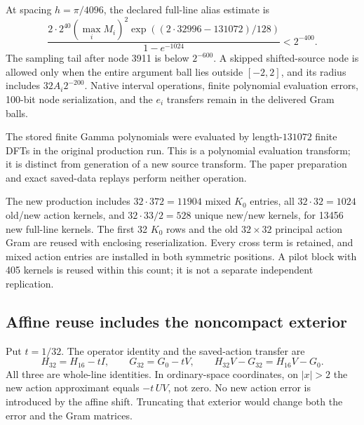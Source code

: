\documentclass[11pt,a4paper]{article}
\numberwithin{equation}{section}
\theoremstyle{definition}\newtheorem{definition}[theorem]{Definition}
\theoremstyle{remark}\newtheorem{remark}[theorem]{Remark}
\begin{document}
At spacing $h=\pi/4096$, the declared full-line alias estimate is
\begin{equation}\label{eq:alias64}
 \frac{2\cdot2^{40}(\max_iM_i)^2
 \exp((2\cdot32996-131072)/128)}{1-e^{-1024}}
 <2^{-400}.
\end{equation}
The sampling tail after node 3911 is below $2^{-600}$. A skipped shifted-source node is allowed only when the entire argument ball lies outside $[-2,2]$, and its radius includes $32A_i2^{-200}$. Native interval operations, finite polynomial evaluation errors, 100-bit node serialization, and the $e_i$ transfers remain in the delivered Gram balls.

The stored finite Gamma polynomials were evaluated by length-$131072$ finite DFTs in the original production run. This is a polynomial evaluation transform; it is distinct from generation of a new source transform. The paper preparation and exact saved-data replays perform neither operation.

The new production includes $32\cdot372=11904$ mixed $K_0$ entries, all $32\cdot32=1024$ old/new action kernels, and $32\cdot33/2=528$ unique new/new kernels, for 13456 new full-line kernels. The first 32 $K_0$ rows and the old $32\times32$ principal action Gram are reused with enclosing reserialization. Every cross term is retained, and mixed action entries are installed in both symmetric positions. A pilot block with 405 kernels is reused within this count; it is not a separate independent replication.

\subsection{Affine reuse includes the noncompact exterior}
Put $t=1/32$. The operator identity and the saved-action transfer are
\begin{equation}\label{eq:affinewhole}
 H_{32}=H_{16}-tI,\qquad G_{32}=G_0-tV,
 \qquad H_{32}V-G_{32}=H_{16}V-G_0.
\end{equation}
All three are whole-line identities. In ordinary-space coordinates, on $|x|>2$ the new action approximant equals $-t\,UV$, not zero. No new action error is introduced by the affine shift. Truncating that exterior would change both the error and the Gram matrices.
\end{document}
